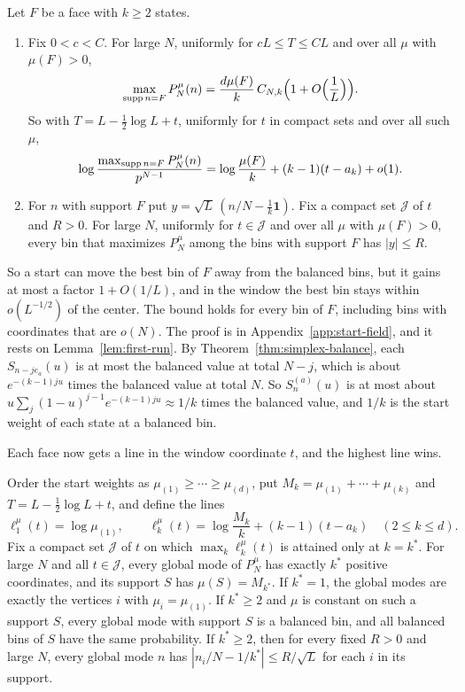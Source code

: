 \begin{theorem}\label{thm:start-maxima}
Let $F$ be a face with $k\ge2$ states.
\begin{enumerate}[(1)]
\item Fix $0<c<C$. For large $N$, uniformly for $cL\le T\le CL$ and over all
$\mu$ with $\mu(F)>0$,
\[
 \max_{\operatorname{supp} n=F}P^\mu_N(n)=\frac{d\mu(F)}k\,C_{N,k}
 \Bigl(1+O\Bigl(\frac1L\Bigr)\Bigr).
\]
So with $T=L-\frac12\log L+t$, uniformly for $t$ in compact sets and over all
such $\mu$,
\[
 \log\frac{\max_{\operatorname{supp} n=F}P^\mu_N(n)}{p^{N-1}}
 =\log\frac{\mu(F)}k+(k-1)(t-a_k)+o(1).
\]
\item For $n$ with support $F$ put $y=\sqrt L\,(n/N-\frac1k\mathbf1)$. Fix a compact set $\mathcal J$ of $t$ and $R>0$. For
large $N$, uniformly for $t\in\mathcal J$ and over all $\mu$ with $\mu(F)>0$,
every bin that maximizes $P^\mu_N$ among the bins with support $F$ has
$|y|\le R$.
\end{enumerate}
\end{theorem}

So a start can move the best bin of $F$ away from the balanced bins, but it
gains at most a factor $1+O(1/L)$, and in the window the best bin stays within
$o(L^{-1/2})$ of the center. The bound holds for every bin of $F$, including bins
with coordinates that are $o(N)$. The proof is in Appendix~\ref{app:start-field},
and it rests on Lemma~\ref{lem:first-run}. By Theorem~\ref{thm:simplex-balance}, each
$S_{n-je_a}(u)$ is at most the balanced value at total $N-j$, which is about
$e^{-(k-1)ju}$ times the balanced value at total $N$. So $S^{(a)}_n(u)$ is at
most about $u\sum_j(1-u)^{j-1}e^{-(k-1)ju}\approx1/k$ times the balanced value,
and $1/k$ is the start weight of each state at a balanced bin.

Each face now gets a line in the window coordinate $t$, and the highest line
wins.

\begin{corollary}\label{cor:start-modes}
Order the start weights as $\mu_{(1)}\ge\cdots\ge\mu_{(d)}$, put
$M_k=\mu_{(1)}+\cdots+\mu_{(k)}$ and $T=L-\frac12\log L+t$, and define the
lines
\[
 \ell^\mu_1(t)=\log\mu_{(1)},\qquad
 \ell^\mu_k(t)=\log\frac{M_k}k+(k-1)(t-a_k)\quad(2\le k\le d).
\]
Fix a compact set $\mathcal J$ of $t$ on which $\max_k\ell^\mu_k(t)$ is attained
only at $k=k^*$. For large $N$ and all $t\in\mathcal J$, every global mode of
$P^\mu_N$ has exactly $k^*$ positive coordinates, and its support $S$ has
$\mu(S)=M_{k^*}$. If $k^*=1$, the global modes are exactly the vertices $i$ with
$\mu_i=\mu_{(1)}$. If $k^*\ge2$ and $\mu$ is constant on such a support $S$,
every global mode with support $S$ is a balanced bin, and all balanced bins of
$S$ have the same probability.
If $k^*\ge2$, then for every fixed $R>0$ and large $N$, every global mode $n$
has $|n_i/N-1/k^*|\le R/\sqrt L$ for each $i$ in its support.
\end{corollary}

